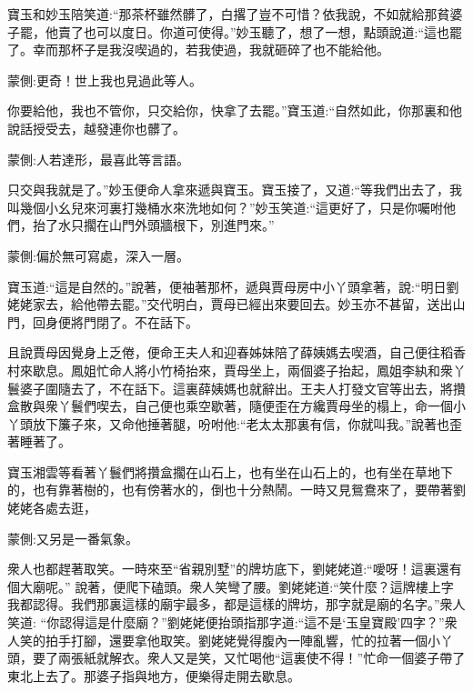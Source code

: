 \begin{parag}
    寶玉和妙玉陪笑道:“那茶杯雖然髒了，白撂了豈不可惜？依我說，不如就給那貧婆子罷，他賣了也可以度日。你道可使得。”妙玉聽了，想了一想，點頭說道:“這也罷了。幸而那杯子是我沒喫過的，若我使過，我就砸碎了也不能給他。\begin{note}蒙側:更奇！世上我也見過此等人。\end{note}你要給他，我也不管你，只交給你，快拿了去罷。”寶玉道:“自然如此，你那裏和他說話授受去，越發連你也髒了。\begin{note}蒙側:人若達形，最喜此等言語。\end{note}只交與我就是了。”妙玉便命人拿來遞與寶玉。寶玉接了，又道:“等我們出去了，我叫幾個小幺兒來河裏打幾桶水來洗地如何？”妙玉笑道:“這更好了，只是你囑咐他們，抬了水只擱在山門外頭牆根下，別進門來。”\begin{note}蒙側:偏於無可寫處，深入一層。\end{note}寶玉道:“這是自然的。”說著，便袖著那杯，遞與賈母房中小丫頭拿著，說:“明日劉姥姥家去，給他帶去罷。”交代明白，賈母已經出來要回去。妙玉亦不甚留，送出山門，回身便將門閉了。不在話下。
\end{parag}


\begin{parag}
    且說賈母因覺身上乏倦，便命王夫人和迎春姊妹陪了薛姨媽去喫酒，自己便往稻香村來歇息。鳳姐忙命人將小竹椅抬來，賈母坐上，兩個婆子抬起，鳳姐李紈和衆丫鬟婆子圍隨去了，不在話下。這裏薛姨媽也就辭出。王夫人打發文官等出去，將攢盒散與衆丫鬟們喫去，自己便也乘空歇著，隨便歪在方纔賈母坐的榻上，命一個小丫頭放下簾子來，又命他捶著腿，吩咐他:“老太太那裏有信，你就叫我。”說著也歪著睡著了。
\end{parag}


\begin{parag}
    寶玉湘雲等看著丫鬟們將攢盒擱在山石上，也有坐在山石上的，也有坐在草地下的，也有靠著樹的，也有傍著水的，倒也十分熱鬧。一時又見鴛鴦來了，要帶著劉姥姥各處去逛，\begin{note}蒙側:又另是一番氣象。\end{note}衆人也都趕著取笑。一時來至“省親別墅”的牌坊底下，劉姥姥道:“噯呀！這裏還有個大廟呢。” 說著，便爬下磕頭。衆人笑彎了腰。劉姥姥道:“笑什麼？這牌樓上字我都認得。我們那裏這樣的廟宇最多，都是這樣的牌坊，那字就是廟的名字。”衆人笑道: “你認得這是什麼廟？”劉姥姥便抬頭指那字道:“這不是‘玉皇寶殿’四字？”衆人笑的拍手打腳，還要拿他取笑。劉姥姥覺得腹內一陣亂響，忙的拉著一個小丫頭，要了兩張紙就解衣。衆人又是笑，又忙喝他“這裏使不得！”忙命一個婆子帶了東北上去了。那婆子指與地方，便樂得走開去歇息。
\end{parag}


